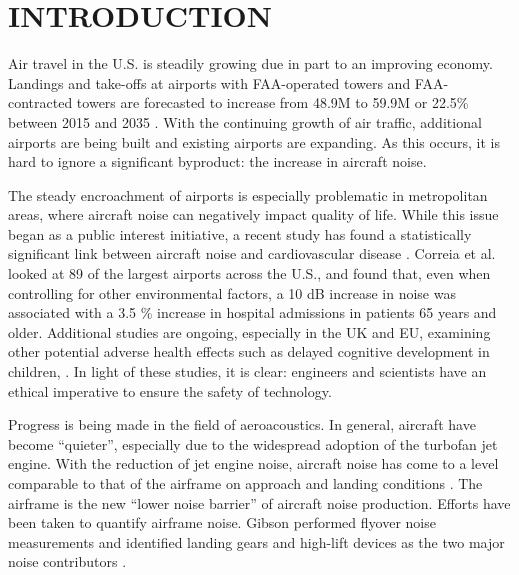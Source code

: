 %
%
%
%
%
%
%
%
%
%


%
%

\chapter{INTRODUCTION}
Air travel in the U.S. is steadily growing due in part to an improving economy. Landings and take-offs at airports with FAA-operated towers and FAA-contracted towers are forecasted to increase from 48.9M to 59.9M or 22.5\% between 2015 and 2035 \cite{faa2015}. With the continuing growth of air traffic, additional airports are being built and existing airports are expanding. As this occurs, it is hard to ignore a significant byproduct: the increase in aircraft noise.

The steady encroachment of airports is especially problematic in metropolitan areas, where aircraft noise can negatively impact quality of life. While this issue began as a public interest initiative, a recent study has found a statistically significant link between aircraft noise and cardiovascular disease \cite{correia2013}. Correia et al. looked at 89 of the largest airports across the U.S., and found that, even when controlling for other environmental factors, a 10 dB increase in noise was associated with a 3.5 \% increase in hospital admissions in patients 65 years and older. Additional studies are ongoing, especially in the UK and EU, examining other potential adverse health effects such as delayed cognitive development in children,  \cite{cap2014}. In light of these studies, it is clear: engineers and scientists have an ethical imperative to ensure the safety of technology. 

Progress is being made in the field of aeroacoustics. In general, aircraft have become ``quieter'', especially due to the widespread adoption of the turbofan jet engine. With the reduction of jet engine noise, aircraft noise has come to a level comparable to that of the airframe on approach and landing conditions \cite{dob2010}. The airframe is the new ``lower noise barrier'' of aircraft noise production. Efforts have been taken to quantify airframe noise. Gibson performed flyover noise measurements and identified landing gears and high-lift devices as the two major noise contributors \cite{gibson}.

